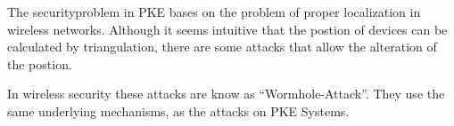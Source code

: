 The securityproblem in PKE bases on the problem of proper localization in
wireless networks.
Although it seems intuitive that the postion of devices can be calculated by
triangulation, there are some attacks that allow the alteration of the postion.


In wireless security these attacks are know as ``Wormhole-Attack''.
They use the same underlying mechanisms, as the attacks on PKE Systems.

